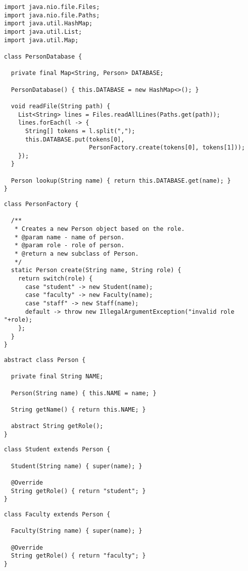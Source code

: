 \begin{lstlisting}[language=MyJava]
import java.nio.file.Files;
import java.nio.file.Paths;
import java.util.HashMap;
import java.util.List;
import java.util.Map;

class PersonDatabase {

  private final Map<String, Person> DATABASE;

  PersonDatabase() { this.DATABASE = new HashMap<>(); }

  void readFile(String path) {
    List<String> lines = Files.readAllLines(Paths.get(path));
    lines.forEach(l -> {
      String[] tokens = l.split(",");
      this.DATABASE.put(tokens[0], 
                        PersonFactory.create(tokens[0], tokens[1]));
    });
  }

  Person lookup(String name) { return this.DATABASE.get(name); }
}
\end{lstlisting}

\begin{lstlisting}[language=MyJava]
class PersonFactory {
  
  /**
   * Creates a new Person object based on the role.
   * @param name - name of person.
   * @param role - role of person.
   * @return a new subclass of Person.
   */
  static Person create(String name, String role) {
    return switch(role) {
      case "student" -> new Student(name);
      case "faculty" -> new Faculty(name);
      case "staff" -> new Staff(name);
      default -> throw new IllegalArgumentException("invalid role "+role);
    };
  }
}
\end{lstlisting}

\begin{lstlisting}[language=MyJava]
abstract class Person {

  private final String NAME;

  Person(String name) { this.NAME = name; }

  String getName() { return this.NAME; }

  abstract String getRole();
}
\end{lstlisting}

\begin{lstlisting}[language=MyJava]
class Student extends Person {

  Student(String name) { super(name); }

  @Override
  String getRole() { return "student"; }
}
\end{lstlisting}

\begin{lstlisting}[language=MyJava]
class Faculty extends Person {

  Faculty(String name) { super(name); }

  @Override
  String getRole() { return "faculty"; }
}
\end{lstlisting}

